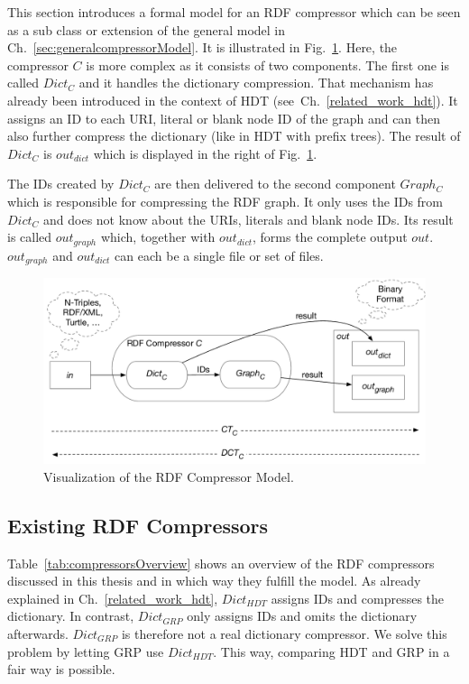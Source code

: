 This section introduces a formal model for an RDF compressor which can be seen as a sub class or extension of the general model in Ch.~\ref{sec:generalcompressorModel}. It is illustrated in Fig.~\ref{fig:compressorModel}. Here, the compressor $C$ is more complex as it consists of two components. The first one is called $Dict_C$ and it handles the dictionary compression. That mechanism has already been introduced in the context of HDT (see~Ch.~\ref{related_work_hdt}). It assigns an ID to each URI, literal or blank node ID of the graph and can then also further compress the dictionary (like in HDT with prefix trees). The result of $Dict_C$ is $out_{dict}$ which is displayed in the right of Fig.~\ref{fig:compressorModel}. 

The IDs created by $Dict_C$ are then delivered to the second component $Graph_C$ which is responsible for compressing the RDF graph. It only uses the IDs from $Dict_C$ and does not know about the URIs, literals and blank node IDs. Its result is called $out_{graph}$ which, together with $out_{dict}$, forms the complete output $out$. $out_{graph}$ and $out_{dict}$ can each be a single file or set of files. 

\begin{figure}
	\centering
	\includegraphics[width=\linewidth]{figures/approach/model}
	\caption{Visualization of the RDF Compressor Model.}
	\label{fig:compressorModel}
\end{figure}


\subsection{Existing RDF  Compressors}

Table~\ref{tab:compressorsOverview} shows an overview of the RDF compressors discussed in this thesis and in which way they fulfill the model. As already explained in Ch.~\ref{related_work_hdt}, $Dict_{HDT}$ assigns IDs and compresses the dictionary. In contrast, $Dict_{GRP}$  only assigns IDs and omits the dictionary afterwards. $Dict_{GRP}$ is therefore not a real dictionary compressor. We solve this problem by letting GRP use $Dict_{HDT}$. This way, comparing HDT and GRP in a fair way is possible.

